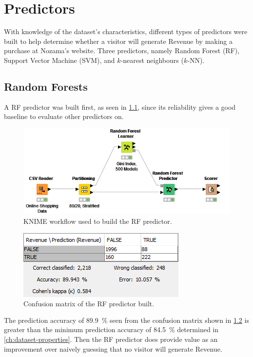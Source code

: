 \documentclass[../cmpe-251-project-report.tex]{subfiles}
\begin{document}
  \chapter{Predictors}
  With knowledge of the dataset's characteristics, different types of predictors were built to help determine whether a visitor will generate Revenue by making a purchase at Nozama's website. Three predictors, namely Random Forest (RF), Support Vector Machine (SVM), and \(k\)-nearest neighbours (\(k\)-NN).
  \section{Random Forests}
  A RF predictor was built first, as seen in \cref{fig:rf-workflow}, since its reliability gives a good baseline to evaluate other predictors on.
  \begin{figure}
    \includegraphics{img/rf-workflow.png}
    \caption{KNIME workflow used to build the RF predictor.}
    \label{fig:rf-workflow}
  \end{figure}
  \begin{figure}
    \includegraphics{img/rf-confusion-matrix.png}
    \caption{Confusion matrix of the RF predictor built.}
    \label{fig:rf-confusion-matrix}
  \end{figure}
  The prediction accuracy of \qty{89.9}{\percent} seen from the confusion matrix shown in \cref{fig:rf-confusion-matrix} is greater than the minimum prediction accuracy of \qty{84.5}{\percent} determined in \cref{ch:dataset-properties}. Then the RF predictor does provide value as an improvement over naively guessing that no visitor will generate Revenue.
\end{document}

